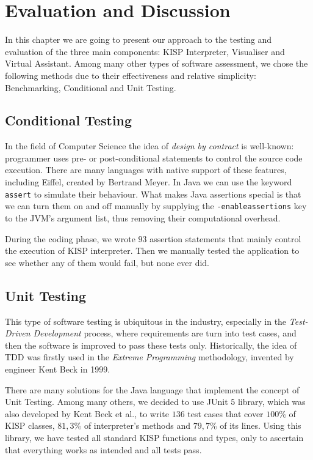 \chapter{Evaluation and Discussion}
\label{chap:eval}


In this chapter we are going to present our approach to the testing and evaluation of the three main components: KISP
Interpreter, Visualiser and Virtual Assistant. Among many other types of software assessment, we chose the following methods
due to their effectiveness and relative simplicity: Benchmarking, Conditional and Unit Testing.

\section{Conditional Testing}
In the field of Computer Science the idea of \textit{design by contract} is well-known: programmer uses pre- or post-conditional
statements to control the source code execution. There are many languages with native support of these features, including
Eiffel\cite{eiffel}, created by Bertrand Meyer. In Java we can use the keyword \texttt{assert} to simulate their behaviour.
What makes Java assertions special is that we can turn them on and off manually by supplying the
\texttt{-enableassertions} key to the JVM's argument list, thus removing their computational overhead.

During the coding phase, we wrote $93$ assertion statements that mainly control the execution of KISP interpreter.
Then we manually tested the application to see whether any of them would fail, but none ever did.

\section{Unit Testing}
This type of software testing is ubiquitous in the industry, especially in the \textit{Test-Driven Development} process, where
requirements are turn into test cases, and then the software is improved to pass these tests only.
Historically, the idea of TDD was firstly used in the \textit{Extreme Programming} methodology, invented\cite{beck} by
engineer Kent Beck in 1999.

There are many solutions for the Java language that implement the concept of Unit Testing. Among many others, we decided to use
JUnit\cite{junit} $5$ library, which was also developed by Kent Beck et al., to write $136$ test cases that cover $100$\% of KISP
classes, $81,3$\% of interpreter's methods and $79,7$\% of its lines. Using this library, we have tested all standard KISP
functions and types, only to ascertain that everything works as intended and all tests pass.

